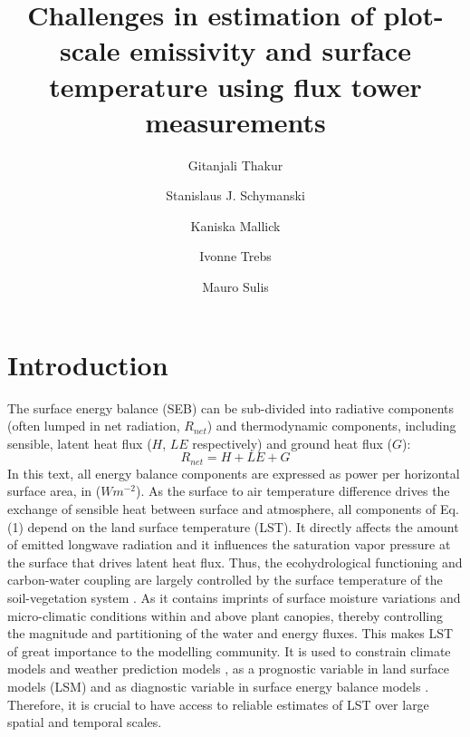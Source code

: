 \documentclass[fleqn,10pt]{wlscirep}
\title{ Challenges in estimation of plot-scale emissivity and surface temperature using flux tower measurements}
\author[1,*]{Gitanjali Thakur}
\author[1]{ Stanislaus J. Schymanski}
\author[1]{Kaniska Mallick }
\author[1]{Ivonne Trebs}
\author[1]{Mauro Sulis}
\affil[1]{Luxembourg Institute of Science and Technology, ERIN, Belvaux, L-4422, Luxembourg}
\affil[*]{gitanjali.thakur@list.lu}
\begin{document}
\flushbottom
\maketitle
%
%
\thispagestyle{empty}


\section*{Introduction}
The surface energy balance (SEB) can be sub-divided into radiative components (often lumped in net radiation, $R_{net}$) and thermodynamic components, including sensible, latent heat flux ($H$, $LE$ respectively) and ground heat flux ($G$):
\begin{equation}\label{eq_seb}
R_{net} = H + LE + G 
\end{equation}
In this text, all energy balance components are expressed as power per horizontal surface area, in ($W m^{-2}$). %
As the surface to air temperature difference drives the exchange of sensible heat between surface and atmosphere, all components of Eq. (1) depend on the land surface temperature (LST). It directly affects the amount of emitted longwave radiation and it influences the saturation vapor pressure at the surface that drives latent heat flux. Thus, the ecohydrological functioning and carbon-water coupling are largely controlled by the surface temperature of the soil-vegetation system \cite{still2021imaging}. As it contains imprints of surface moisture variations and micro-climatic conditions within and above plant canopies, thereby controlling the magnitude and partitioning of the water and energy fluxes\cite{mallick2015reintroducing}. This makes LST of great importance to the modelling community. It is used to constrain climate models and weather prediction models \cite{zheng2012improvement,koch2016spatial}, as a prognostic variable in land surface models (LSM) and as diagnostic variable in surface energy balance models \cite{koch2016spatial,mallick2015reintroducing}. Therefore, it is crucial to have access to reliable estimates of LST over large spatial and temporal scales. 
\end{document}
